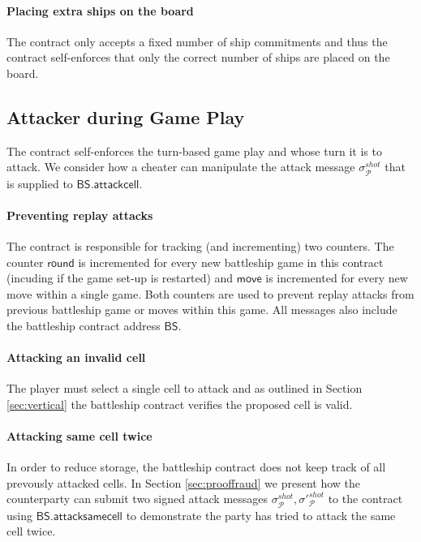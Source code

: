 \documentclass{llncs}
\newcommand{\participant}{\mathcal{P}}
\newcommand{\battleship}{\mathsf{BS}}
\newcommand{\battleshipattackcell}{\mathsf{BS.attackcell}}
\newcommand{\battleshipsamecell}{\mathsf{BS.attacksamecell}}
\begin{document}
\paragraph{Placing extra ships on the board} 
The contract only accepts a fixed number of ship commitments and thus the contract self-enforces that only the correct number of ships are placed on the board. 

\subsection{Attacker during Game Play} 

The contract self-enforces the turn-based game play and whose turn it is to attack.
We consider how a cheater can manipulate the attack message $\sigma^{shot}_{\participant}$ that is supplied to $\battleshipattackcell$. 

\paragraph{Preventing replay attacks}
The contract is responsible for tracking (and incrementing) two counters. 
The counter $\mathsf{round}$ is incremented for every new battleship game in this contract (incuding if the game set-up is restarted) and $\mathsf{move}$ is incremented for every new move within a single game. 
Both counters are used to prevent replay attacks from previous battleship game or moves within this game. 
All messages also include the battleship contract address $\battleship$.

\paragraph{Attacking an invalid cell}
The player must select a single cell to attack and as outlined in Section \ref{sec:vertical} the battleship contract verifies the proposed cell is valid. 

\paragraph{Attacking same cell twice} 
In order to reduce storage, the battleship contract does not keep track of all prevously attacked cells. 
In Section \ref{sec:prooffraud} we present how the counterparty can submit two signed attack messages $\sigma^{shot}_{\participant},\sigma'^{shot}_{\participant}$ to the contract using $\battleshipsamecell$ to demonstrate the party has tried to attack the same cell twice. 
\end{document}
